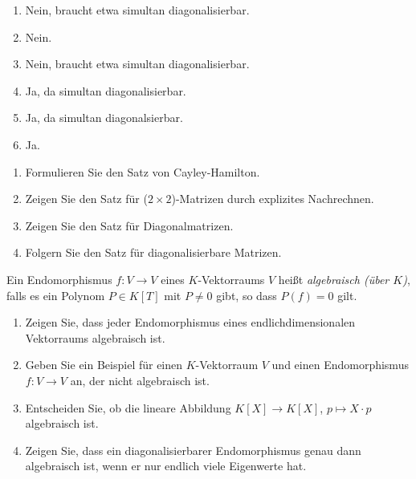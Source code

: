 \documentclass[a4paper,10pt]{scrartcl}
\begin{document}
\begin{solution}
  \begin{enumerate}
    \item
      Nein, braucht etwa simultan diagonalisierbar.
    \item
      Nein.
    \item
      Nein, braucht etwa simultan diagonalisierbar.
    \item
      Ja, da simultan diagonalisierbar.
    \item
      Ja, da simultan diagonalsierbar.
    \item
      Ja.
  \end{enumerate}
\end{solution}


\begin{question}
  \begin{enumerate}[leftmargin=*]
    \item
      Formulieren Sie den Satz von Cayley-Hamilton.
    \item
      Zeigen Sie den Satz für ($2 \times 2$)-Matrizen durch explizites Nachrechnen.
    \item
      Zeigen Sie den Satz für Diagonalmatrizen.
    \item
      Folgern Sie den Satz für diagonalisierbare Matrizen.
  \end{enumerate}
\end{question}


\begin{question}
  Ein Endomorphismus $f \colon V \to V$ eines $K$-Vektorraums $V$ heißt \emph{algebraisch (über $K$)}, falls es ein Polynom $P \in K[T]$ mit $P \neq 0$ gibt, so dass $P(f) = 0$ gilt.
  \begin{enumerate}[leftmargin=*]
    \item
      Zeigen Sie, dass jeder Endomorphismus eines endlichdimensionalen Vektorraums algebraisch ist.
    \item
      Geben Sie ein Beispiel für einen $K$-Vektorraum $V$ und einen Endomorphismus $f \colon V \to V$ an, der nicht algebraisch ist.
    \item
      Entscheiden Sie, ob die lineare Abbildung $K[X] \to K[X]$, $p \mapsto X \cdot p$ algebraisch ist.
    \item
      Zeigen Sie, dass ein diagonalisierbarer Endomorphismus genau dann algebraisch ist, wenn er nur endlich viele Eigenwerte hat.
  \end{enumerate}
\end{question}
\end{document}
